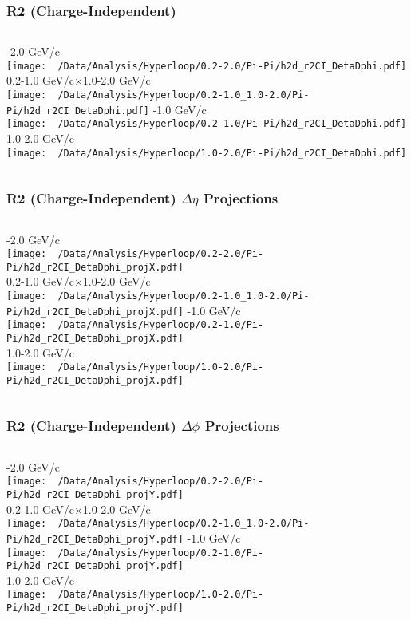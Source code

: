 \documentclass{beamer}
\begin{document}
\begin{frame}
	\frametitle{R2 (Charge-Independent)}
	\begin{columns}
		-2.0 GeV/c\\
		\texttt{[image: ~/Data/Analysis/Hyperloop/0.2-2.0/Pi-Pi/h2d\_r2CI\_DetaDphi.pdf]}\\0.2-1.0 GeV/c$\times$1.0-2.0 GeV/c\\
		\texttt{[image: ~/Data/Analysis/Hyperloop/0.2-1.0\_1.0-2.0/Pi-Pi/h2d\_r2CI\_DetaDphi.pdf]}
		-1.0 GeV/c\\
		\texttt{[image: ~/Data/Analysis/Hyperloop/0.2-1.0/Pi-Pi/h2d\_r2CI\_DetaDphi.pdf]}\\1.0-2.0 GeV/c\\
		\texttt{[image: ~/Data/Analysis/Hyperloop/1.0-2.0/Pi-Pi/h2d\_r2CI\_DetaDphi.pdf]}
	\end{columns}
\end{frame}
\begin{frame}
	\frametitle{R2 (Charge-Independent) $\Delta\eta$ Projections}
	\begin{columns}
		\column{0.5\textwidth}
		-2.0 GeV/c\\
		\texttt{[image: ~/Data/Analysis/Hyperloop/0.2-2.0/Pi-Pi/h2d\_r2CI\_DetaDphi\_projX.pdf]}\\0.2-1.0 GeV/c$\times$1.0-2.0 GeV/c\\
		\texttt{[image: ~/Data/Analysis/Hyperloop/0.2-1.0\_1.0-2.0/Pi-Pi/h2d\_r2CI\_DetaDphi\_projX.pdf]}
		\column{0.5\textwidth}
		-1.0 GeV/c\\
		\texttt{[image: ~/Data/Analysis/Hyperloop/0.2-1.0/Pi-Pi/h2d\_r2CI\_DetaDphi\_projX.pdf]}\\1.0-2.0 GeV/c\\
		\texttt{[image: ~/Data/Analysis/Hyperloop/1.0-2.0/Pi-Pi/h2d\_r2CI\_DetaDphi\_projX.pdf]}
	\end{columns}
\end{frame}
\begin{frame}
	\frametitle{R2 (Charge-Independent) $\Delta\phi$ Projections}
	\begin{columns}
		-2.0 GeV/c\\
		\texttt{[image: ~/Data/Analysis/Hyperloop/0.2-2.0/Pi-Pi/h2d\_r2CI\_DetaDphi\_projY.pdf]}\\0.2-1.0 GeV/c$\times$1.0-2.0 GeV/c\\
		\texttt{[image: ~/Data/Analysis/Hyperloop/0.2-1.0\_1.0-2.0/Pi-Pi/h2d\_r2CI\_DetaDphi\_projY.pdf]}
		-1.0 GeV/c\\
		\texttt{[image: ~/Data/Analysis/Hyperloop/0.2-1.0/Pi-Pi/h2d\_r2CI\_DetaDphi\_projY.pdf]}\\1.0-2.0 GeV/c\\
		\texttt{[image: ~/Data/Analysis/Hyperloop/1.0-2.0/Pi-Pi/h2d\_r2CI\_DetaDphi\_projY.pdf]}
	\end{columns}
\end{frame}
\end{document}
